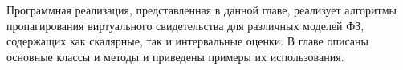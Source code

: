 Программная реализация, представленная в данной главе, реализует алгоритмы пропагирования виртуального свидетельства для различных моделей ФЗ, содержащих как скалярные, так и интервальные оценки. В главе описаны основные классы и методы и приведены примеры их использования.